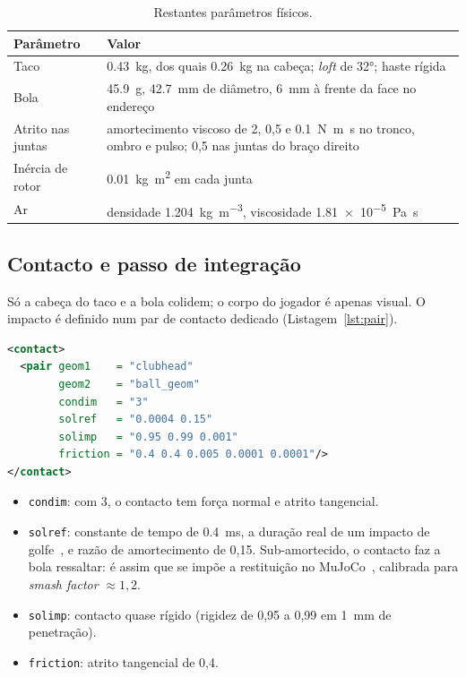 \documentclass[11pt,a4paper]{article}
\begin{document}
\begin{table}[H]
\centering
\caption{Restantes parâmetros físicos.}
\label{tab:params}
\small
\begin{tabularx}{\textwidth}{@{}lL@{}}
\toprule
{}
Parâmetro & Valor \\
\midrule
Taco & \SI{0.43}{\kilo\gram}, dos quais \SI{0.26}{\kilo\gram} na cabeça;
       \emph{loft} de \ang{32}; haste rígida~\cite{milne1992} \\
Bola & \SI{45.9}{\gram}, \SI{42.7}{\milli\meter} de diâmetro,
       \SI{6}{\milli\meter} à frente da face no endereço \\
Atrito nas juntas & amortecimento viscoso de 2, 0{,}5 e
       \SI{0.1}{\newton\meter\second} no tronco, ombro e pulso; 0{,}5 nas
       juntas do braço direito \\
Inércia de rotor & \SI{0.01}{\kilo\gram\meter\squared} em cada junta \\
Ar & densidade \SI{1.204}{\kilo\gram\per\meter\cubed}, viscosidade
       \SI{1.81e-5}{\pascal\second} \\
\bottomrule
\end{tabularx}
\end{table}

\subsection{Contacto e passo de integração}
\label{sec:contacto}

Só a cabeça do taco e a bola colidem; o corpo do jogador é apenas visual. O
impacto é definido num par de contacto dedicado (Listagem~\ref{lst:pair}).

\begin{lstlisting}[language=XML, caption={Par de contacto taco--bola em
  \texttt{golfer\_v17.xml}.}, label={lst:pair}, captionpos=b]
<contact>
  <pair geom1    = "clubhead"
        geom2    = "ball_geom"
        condim   = "3"
        solref   = "0.0004 0.15"
        solimp   = "0.95 0.99 0.001"
        friction = "0.4 0.4 0.005 0.0001 0.0001"/>
</contact>
\end{lstlisting}

\begin{itemize}
  \item \texttt{condim}: com 3, o contacto tem força normal e atrito
        tangencial.
  \item \texttt{solref}: constante de tempo de \SI{0.4}{\milli\second}, a
        duração real de um impacto de golfe~\cite{penner2003}, e razão de
        amortecimento de 0,15. Sub-amortecido, o contacto faz a bola ressaltar:
        é assim que se impõe a restituição no
        MuJoCo~\cite{todorov2012}, calibrada para \emph{smash factor}
        $\approx 1{,}2$.
  \item \texttt{solimp}: contacto quase rígido (rigidez de 0,95 a 0,99 em
        \SI{1}{\milli\meter} de penetração).
  \item \texttt{friction}: atrito tangencial de 0,4.
\end{itemize}
\end{document}
